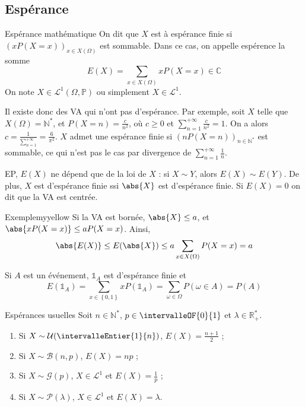 \subsection{Espérance} 

    \begin{defi}{Espérance mathématique}{}
        On dit que $X$ est à espérance finie si $(x P(X = x))_{x \in X(\Omega)}$ est sommable. Dans ce cas, on appelle espérence la somme 
        \[ E(X) = \sum_{x \in X(\Omega)} x P(X = x) \in \mathbb{C} \]   
        On note $X \in \mathcal{L}^1(\Omega, \mathbb{P})$ ou simplement $X \in \mathcal{L}^1$.
    \end{defi}

    Il existe donc des VA qui n’ont pas d’espérance. Par exemple, soit $X$ telle que $X(\Omega) = \mathbb{N}^*$, et $P(X = n) = \frac{c}{n^2}$, où $c \geq 0$ et $\sum_{n = 1}^{+\infty} \frac{c}{n^2} = 1$. On a alors $c = \frac{1}{\sum_{n = 1}^{+\infty}} = \frac{6}{\pi^2}$. $X$ admet une espérance finie si $(n P(X = n))_{n \in \mathbb{N}^*}$ est sommable, ce qui n’est pas le cas par divergence de $\sum_{n=1}^{+\infty} \frac{1}{n}$.

    EP, $E(X)$ ne dépend que de la loi de $X$ : si $X \sim Y$, alors $E(X) \sim E(Y)$. De plus, $X$ est d’espérance finie ssi $\abs{X}$ est d’espérance finie. Si $E(X) = 0$ on dit que la VA est centrée. 

    \begin{omed}{Exemple}{myyellow}
        Si la VA est bornée, $\abs{X} \leq a$, et $\abs{x P(X = x)} \leq a P(X = x)$. Ainsi, 
        \[ \abs{E(X)} \leq E(\abs{X}) \leq a \sum_{x \in X(\Omega)} P(X = x) = a \]   

        Si $A$ est un événement, $\mathbb{1}_A$ est d’espérance finie et 
        \[ E(\mathbb{1}_A) = \sum_{x \in \left\{0,1\right\}} x P(\mathbb{1}_A) = \sum_{\omega \in \Omega} P(\omega \in A) = P(A) \]   
    \end{omed}

    \begin{theo}{Espérances usuelles}{}
        Soit $n \in \mathbb{N}^*$, $p \in \intervalleOF{0}{1}$ et $\lambda \in \mathbb{R}_+^*$. 
        \begin{enumerate}
            \item Si $X \sim \mathcal{U}(\intervalleEntier{1}{n})$, $E(X) = \frac{n+1}{2}$ ;
            \item Si $X \sim \mathcal{B}(n,p)$, $E(X) = np$ ;
            \item Si $X \sim \mathcal{G}(p)$, $X \in \mathcal{L}^1$ et $E(X) = \frac{1}{p}$ ;
            \item Si $X \sim \mathcal{P}(\lambda)$, $X \in \mathcal{L}^1$ et $E(X) = \lambda$. 
        \end{enumerate}
    \end{theo}

